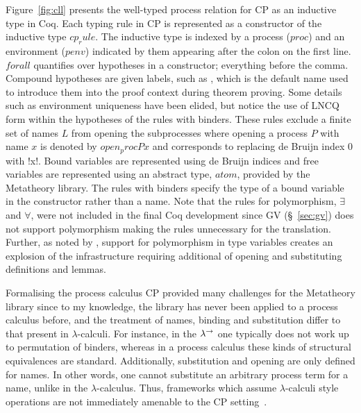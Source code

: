 Figure~\ref{fig:cll} presents the well-typed process relation for CP as an
inductive type in Coq. Each typing rule in CP is represented as a constructor
of the inductive type \coqe$cp_rule$. The inductive type is indexed by a
process (\coqe$proc$) and an environment (\coqe$penv$) indicated by them
appearing after the colon on the first line. \coqe$forall$ quantifies over
hypotheses in a constructor; everything before the comma. Compound hypotheses
are given labels, such as , which is the default name used to
introduce them into the proof context during theorem proving. Some details
such as environment uniqueness have been elided, but notice the use of LNCQ
form within the hypotheses of the rules with binders. These rules exclude a
finite set of names \coqe$L$ from opening the subprocesses where opening a
process \coqe$P$ with name \coqe$x$ is denoted by \coqe$open_proc P x$ and
corresponds to replacing de Bruijn index 0 with \coqe!x!. Bound variables are
represented using de Bruijn indices and free variables are represented using
an abstract type, \coqe$atom$, provided by the Metatheory library. The rules
with binders specify the type of a bound variable in the constructor rather
than a name. Note that the rules for polymorphism, $\exists$ and $\forall$,
were not included in the final Coq development since GV (\S~\ref{sec:gv}) does
not support polymorphism making the rules unnecessary for the
translation. Further, as noted by \citeauthor{Lee:2012}, support for
polymorphism in type variables creates an explosion of the infrastructure
requiring additional of opening and substituting definitions and lemmas.

Formalising the process calculus CP provided many challenges for the
Metatheory library since to my knowledge, the library has never been applied
to a process calculus before, and the treatment of names, binding and
substitution differ to that present in $\lambda$-calculi. For instance, in the
$\lambda^\rightarrow$ one typically does not work up to permutation of binders, whereas in a
process calculus these kinds of structural equivalences are
standard. Additionally, substitution and opening are only defined for
names. In other words, one cannot substitute an arbitrary process term for a
name, unlike in the $\lambda$-calculus. Thus, frameworks which assume
$\lambda$-calculi style operations are not immediately amenable to the CP
setting~\cite{Lee:2012}.

